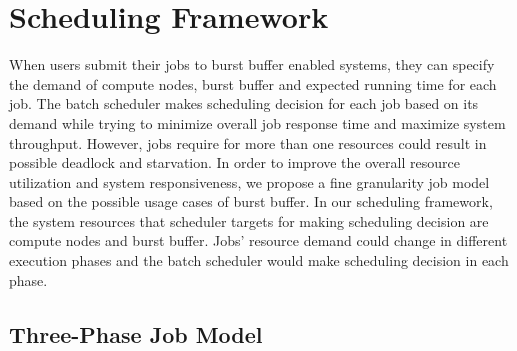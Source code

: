 \section{Scheduling Framework}
\label{Sec:Model}



When users submit their jobs to burst buffer enabled systems, they can specify the 
demand of compute nodes, burst buffer and expected running time for each job.
The batch scheduler makes scheduling decision for each job based on its demand while trying to 
minimize overall job response time and maximize system throughput. 
However, jobs require for more than one resources could result in possible deadlock and starvation.
In order to improve the overall resource utilization and system responsiveness, we propose
a fine granularity job model based on the possible usage cases of burst buffer.  
In our scheduling framework, 
the system resources that scheduler targets for making scheduling decision are
compute nodes and burst buffer.
Jobs' resource demand could change in different execution phases and the batch scheduler 
would make scheduling decision in each phase.


\subsection{Three-Phase Job Model}


